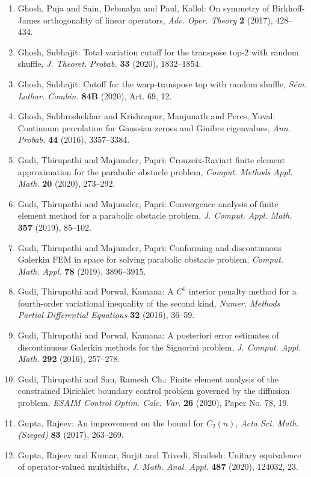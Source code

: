 \begin{enumerate}
\item Ghosh, Puja and Sain, Debmalya and Paul, Kallol: On symmetry of {B}irkhoff-{J}ames orthogonality of linear
operators, \emph{Adv. Oper. Theory} {\bf 2} (2017), 428--434.
\item Ghosh, Subhajit: Total variation cutoff for the transpose top-2 with random
shuffle, \emph{J. Theoret. Probab.} {\bf 33} (2020), 1832--1854.
\item Ghosh, Subhajit: Cutoff for the warp-transpose top with random shuffle, \emph{S\'{e}m. Lothar. Combin.} {\bf 84B} (2020), Art. 69, 12.
\item Ghosh, Subhroshekhar and Krishnapur, Manjunath and Peres,
Yuval: Continuum percolation for {G}aussian zeroes and {G}inibre
eigenvalues, \emph{Ann. Probab.} {\bf 44} (2016), 3357--3384.
\item Gudi, Thirupathi and Majumder, Papri: Crouzeix-{R}aviart finite element approximation for the
parabolic obstacle problem, \emph{Comput. Methods Appl. Math.} {\bf 20} (2020), 273--292.
\item Gudi, Thirupathi and Majumder, Papri: Convergence analysis of finite element method for a parabolic
obstacle problem, \emph{J. Comput. Appl. Math.} {\bf 357} (2019), 85--102.
\item Gudi, Thirupathi and Majumder, Papri: Conforming and discontinuous {G}alerkin {FEM} in space for
solving parabolic obstacle problem, \emph{Comput. Math. Appl.} {\bf 78} (2019), 3896--3915.
\item Gudi, Thirupathi and Porwal, Kamana: A {$C^0$} interior penalty method for a fourth-order
variational inequality of the second kind, \emph{Numer. Methods Partial Differential Equations} {\bf 32} (2016), 36--59.
\item Gudi, Thirupathi and Porwal, Kamana: A posteriori error estimates of discontinuous {G}alerkin
methods for the {S}ignorini problem, \emph{J. Comput. Appl. Math.} {\bf 292} (2016), 257--278.
\item Gudi, Thirupathi and Sau, Ramesh Ch.: Finite element analysis of the constrained {D}irichlet
boundary control problem governed by the diffusion problem, \emph{ESAIM Control Optim. Calc. Var.} {\bf 26} (2020), Paper No. 78, 19.
\item Gupta, Rajeev: An improvement on the bound for {$C_2(n)$}, \emph{Acta Sci. Math. (Szeged)} {\bf 83} (2017), 263--269.
\item Gupta, Rajeev and Kumar, Surjit and Trivedi, Shailesh: Unitary equivalence of operator-valued multishifts, \emph{J. Math. Anal. Appl.} {\bf 487} (2020), 124032, 23.

\end{enumerate}
